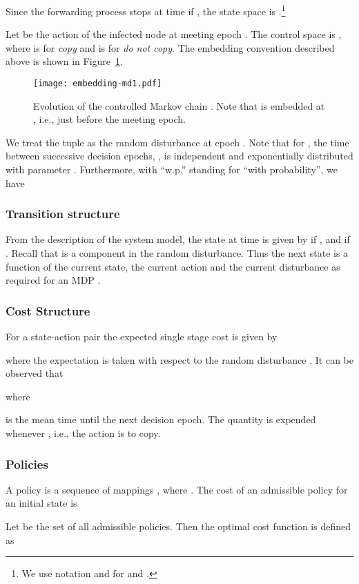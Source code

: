 \documentclass[10pt,journal,letterpaper]{IEEEtran}
\begin{document}
Since the forwarding process stops at time  if , the
state space is .\footnote{We use notation  and  for
 and .}

Let   be the action of the infected node at
meeting epoch .
The control space is
, where  is for {\it copy} and  is for {\it do not copy}.
The embedding convention described
above is shown in Figure~\ref{embedding}.
\begin{figure}[t]{
\centering
\texttt{[image: embedding-md1.pdf]}
\caption{\label{embedding}Evolution of the controlled Markov chain
. Note that  is embedded at , i.e., just before the meeting epoch.}}
\end{figure}

We treat the tuple  as the random
disturbance at epoch . Note that for , the time
between successive decision epochs, , is independent and
exponentially distributed with parameter
. Furthermore, with ``w.p.'' standing for ``with probability'', we have

\subsubsection{Transition structure}
From the description of the system model, the state at time  is given by   if , and  if . Recall that  is a component in the
random disturbance. Thus the next state is  a function of the
current state, the current action and the current disturbance as
required for an MDP .

\subsubsection{Cost Structure}
For a state-action pair 
the expected single stage cost is given by

where the expectation is taken with respect to the random
disturbance . It can be observed that

where

 is the mean time
until the next decision epoch. The quantity  is expended whenever , i.e., the action is to copy.


\subsubsection{Policies} A policy  is a sequence of mappings ,
where . The cost of an admissible policy  for
an initial state  is

Let   be the set of all admissible policies. Then the optimal cost function is defined as
\end{document}
